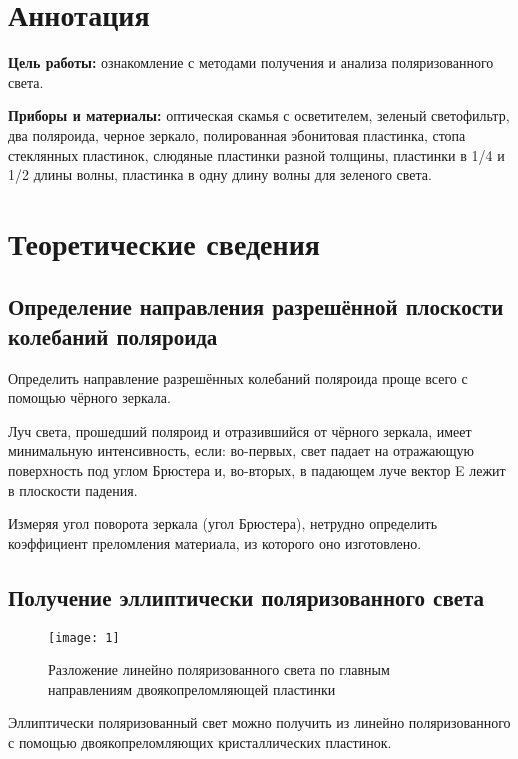





\section{Аннотация}
\textbf{Цель работы:} ознакомление с методами получения и анализа поляризованного света.

\textbf{Приборы и материалы:} оптическая скамья с осветителем, зеленый светофильтр, два поляроида, черное зеркало, полированная эбонитовая пластинка, стопа стеклянных пластинок, слюдяные пластинки разной толщины, пластинки в 1/4 и 1/2 длины волны, пластинка в одну длину волны для зеленого света.

\section{Теоретические сведения}

\subsection{Определение направления разрешённой плоскости колебаний поляроида}

Определить направление разрешённых колебаний поляроида проще всего с помощью чёрного зеркала.

Луч света,
прошедший поляроид и отразившийся от чёрного зеркала, имеет минимальную интенсивность, если: во-первых, свет
падает на отражающую поверхность под углом Брюстера и, во-вторых,
в падающем луче вектор E лежит в плоскости падения.

Измеряя угол поворота зеркала (угол Брюстера), нетрудно определить коэффициент преломления материала, из которого оно изготовлено.

\subsection{Получение эллиптически поляризованного света}
\begin{wrapfigure}{r}{0.35\linewidth} 
	\texttt{[image: 1]}
	\caption{Разложение линейно поляризованного света по главным направлениям двоякопреломляющей пластинки}
	\label{ris 1}
\end{wrapfigure}

Эллиптически поляризованный свет можно получить из линейно поляризованного с
помощью двоякопреломляющих кристаллических пластинок.

